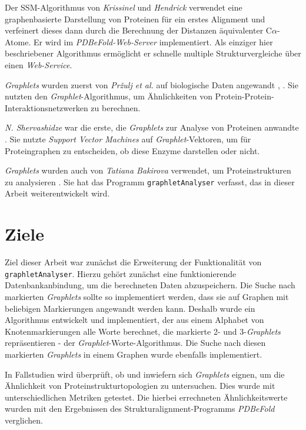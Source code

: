 \documentclass{report}
\begin{document}
Der SSM-Algorithmus von \textit{Krissinel} und \textit{Hendrick} \cite{pdbefold} verwendet eine graphenbasierte Darstellung von Proteinen f\"ur ein erstes Alignment und verfeinert dieses dann durch die Berechnung der Distanzen \"aquivalenter C$\alpha$-Atome. Er wird im \textit{PDBeFold-Web-Server} implementiert. Als einziger hier beschriebener Algorithmus erm\"oglicht er schnelle multiple Strukturvergleiche \"uber einen \textit{Web-Service}.



\textit{Graphlets} wurden zuerst von \textit{Pr{\v z}ulj et al.} auf biologische Daten angewandt \cite{frqdistribution}, \cite{graphletfrequency}. Sie nutzten den \textit{Graphlet}-Algorithmus, um \"Ahnlichkeiten von Protein-Protein-Interaktionsnetzwerken zu berechnen.

\textit{N. Shervashidze} war die erste, die \textit{Graphlets} zur Analyse von Proteinen anwandte \cite{sherv_graphlets}. Sie nutzte \textit{Support Vector Machines} auf \textit{Graphlet}-Vektoren, um  f\"ur Proteingraphen zu entscheiden, ob diese Enzyme darstellen oder nicht.

\textit{Graphlets} wurden auch von \textit{Tatiana Bakirova} verwendet, um Proteinstrukturen zu analysieren \cite{bakirova2013comparison}. Sie hat das Programm \texttt{graphletAnalyser} verfasst, das in dieser Arbeit weiterentwickelt wird.

\section{Ziele}

Ziel dieser Arbeit war zun\"achst die Erweiterung der Funktionalit\"at von \\ \texttt{graphletAnalyser}. Hierzu geh\"ort zun\"achst eine funktionierende Datenbankanbindung, um die berechneten Daten abzuspeichern.
Die Suche nach markierten \textit{Graphlets} sollte so implementiert werden, dass sie auf Graphen mit beliebigen Markierungen angewandt werden kann. Deshalb wurde ein Algorithmus entwickelt und implementiert, der aus einem Alphabet von Knotenmarkierungen alle Worte berechnet, die markierte  2- und 3-\textit{Graphlets} repr\"asentieren - der \textit{Graphlet}-Worte-Algorithmus. Die Suche nach diesen markierten \textit{Graphlets} in einem Graphen wurde ebenfalls implementiert.

In Fallstudien wird \"uberpr\"uft, ob und inwiefern sich \textit{Graphlets} eignen, um die \"Ahnlichkeit von Proteinstrukturtopologien zu untersuchen. Dies wurde mit unterschiedlichen Metriken getestet. Die hierbei errechneten \"Ahnlichkeitswerte wurden mit den Ergebnissen des Strukturalignment-Programms \textit{PDBeFold} \cite{pdbefold} verglichen.
\end{document}

